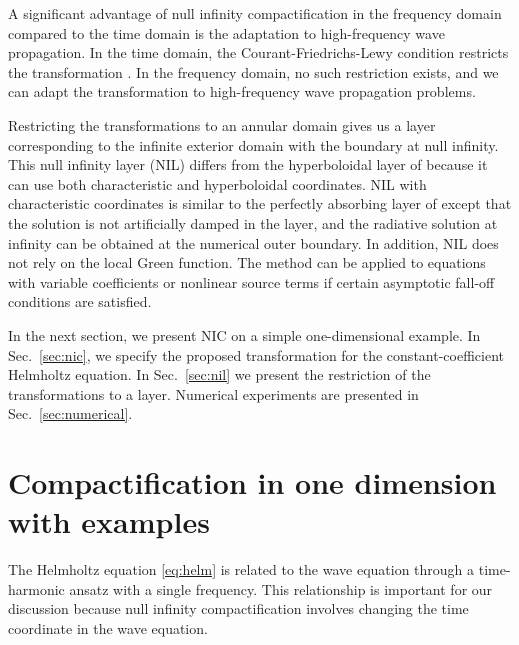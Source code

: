 \documentclass[final,onefignum,onetabnum]{siamart190516}
\begin{document}
A significant advantage of null infinity compactification in the frequency domain compared to the time domain is the adaptation to high-frequency wave propagation. In the time domain, the Courant-Friedrichs-Lewy condition restricts the transformation \cite{ZENGINOGLU20112286}. In the frequency domain, no such restriction exists, and we can adapt the transformation to high-frequency wave propagation problems. 

Restricting the transformations to an annular domain gives us a layer corresponding to the infinite exterior domain with the boundary at null infinity. This null infinity layer (NIL) differs from the hyperboloidal layer of \cite{ZENGINOGLU20112286} because it can use both characteristic and hyperboloidal coordinates. NIL with characteristic coordinates is similar to the perfectly absorbing layer of \cite{wang2017perfect, yang2021truly} except that the solution is not artificially damped in the layer, and the radiative solution at infinity can be obtained at the numerical outer boundary. In addition, NIL does not rely on the local Green function. The method can be applied to equations with variable coefficients or nonlinear source terms if certain asymptotic fall-off conditions are satisfied. 

In the next section, we present NIC on a simple one-dimensional example. In Sec.~\ref{sec:nic}, we specify the proposed transformation for the constant-coefficient Helmholtz equation. In Sec.~\ref{sec:nil} we present the restriction of the transformations to a layer. Numerical experiments are presented in Sec.~\ref{sec:numerical}. 

\section{Compactification in one dimension with examples}\label{sec:simple}
The Helmholtz equation \eqref{eq:helm} is related to the wave equation through a time-harmonic ansatz with a single frequency. This relationship is important for our discussion because null infinity compactification involves changing the time coordinate in the wave equation.
\end{document}

